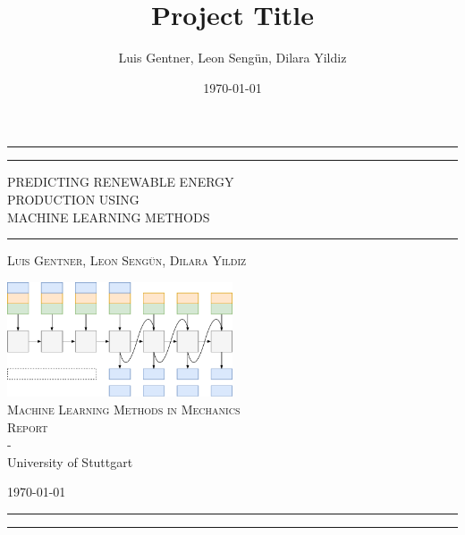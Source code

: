 \documentclass[11pt,table]{article}
\title{Project Title}
\author{Luis Gentner, Leon Sengün, Dilara Yildiz}
\date{\today}
\begin{document}
\begin{titlepage} 
	\centering 
	\rule{\textwidth}{1pt} 
	\vspace{2pt}\vspace{-\baselineskip} 
	\rule{\textwidth}{0.4pt} 
	\vspace{0.1\textheight} 
	
	
	{\Huge PREDICTING RENEWABLE ENERGY }\\[0.5\baselineskip] 
	{\Huge PRODUCTION USING }\\[0.5\baselineskip]
	{\Huge MACHINE LEARNING METHODS} 
	
	
	\vspace{0.025\textheight} 
	\rule{0.3\textwidth}{0.4pt} 
	\vspace{0.1\textheight}
	
	{\Large \textsc{Luis Gentner, Leon Sengün, Dilara Yildiz}} 
	
	\vfill 
	
 	\includegraphics[width=0.5\textwidth]{figures/autoreg-continous-notext.pdf} \\
	\vspace{0.05\textheight}
	{\large\textsc{Machine Learning Methods in Mechanics \\Report}\\ -\\ University of Stuttgart} 
	
	
	\vspace{0.1\textheight} 
	
	{\normalsize \today}
	
	
	\rule{\textwidth}{0.4pt}
	\vspace{2pt}\vspace{-\baselineskip}
	\rule{\textwidth}{1pt}
	
\end{titlepage}

\newpage
\tableofcontents
\printacronyms
\newpage
{}
\end{document}
